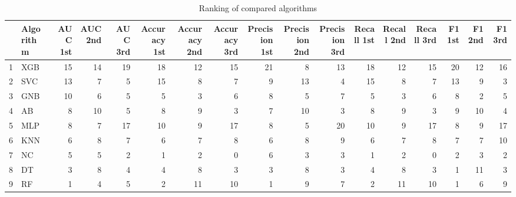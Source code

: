 \begin{table}
\footnotesize
\caption{Ranking of compared algorithms}
\label{tab:places}
\begin{tabular}{llrrrrrrrrrrrrrrr}
\hline
 & Algorithm & AUC 1st & AUC 2nd & AUC 3rd & Accuracy 1st & Accuracy 2nd & Accuracy 3rd & Precision 1st & Precision 2nd & Precision 3rd & Recall 1st & Recall 2nd & Recall 3rd & F1 1st & F1 2nd & F1 3rd \\
\hline
1 & XGB & 15 & 14 & 19 & 18 & 12 & 15 & 21 & 8 & 13 & 18 & 12 & 15 & 20 & 12 & 16 \\
2 & SVC & 13 & 7 & 5 & 15 & 8 & 7 & 9 & 13 & 4 & 15 & 8 & 7 & 13 & 9 & 3 \\
3 & GNB & 10 & 6 & 5 & 5 & 3 & 6 & 8 & 5 & 7 & 5 & 3 & 6 & 8 & 2 & 5 \\
4 & AB & 8 & 10 & 5 & 8 & 9 & 3 & 7 & 10 & 3 & 8 & 9 & 3 & 9 & 10 & 4 \\
5 & MLP & 8 & 7 & 17 & 10 & 9 & 17 & 8 & 5 & 20 & 10 & 9 & 17 & 8 & 9 & 17 \\
6 & KNN & 6 & 8 & 7 & 6 & 7 & 8 & 6 & 8 & 9 & 6 & 7 & 8 & 7 & 7 & 10 \\
7 & NC & 5 & 5 & 2 & 1 & 2 & 0 & 6 & 3 & 3 & 1 & 2 & 0 & 2 & 3 & 2 \\
8 & DT & 3 & 8 & 4 & 4 & 8 & 3 & 3 & 8 & 3 & 4 & 8 & 3 & 1 & 11 & 3 \\
9 & RF & 1 & 4 & 5 & 2 & 11 & 10 & 1 & 9 & 7 & 2 & 11 & 10 & 1 & 6 & 9 \\
\hline
\end{tabular}
\end{table}
